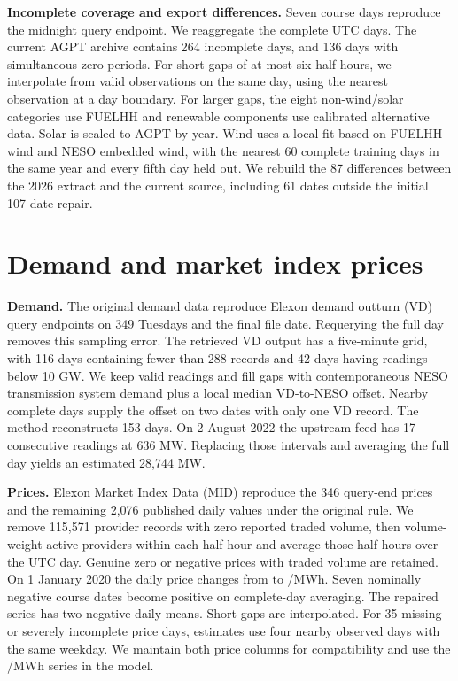 \textbf{Incomplete coverage and export differences.}
Seven course days reproduce the midnight query endpoint. We reaggregate
the complete UTC days. The current AGPT archive contains 264 incomplete
days, and
136 days with simultaneous zero periods. For short gaps of at most six
half-hours, we interpolate from valid observations on the same day, using
the nearest observation at a day boundary. For larger gaps, the eight
non-wind/solar categories use FUELHH and renewable components use
calibrated alternative data. Solar is scaled to AGPT by year. Wind
uses a local fit based on FUELHH wind and NESO embedded wind, with the
nearest 60 complete training days in the same year and every fifth day
held out. We rebuild the 87 differences between the 2026 extract and
the current source, including 61 dates outside the initial 107-date repair.

\newpage
\section{Demand and market index prices}
\textbf{Demand.}
The original demand data reproduce Elexon demand outturn (VD) query
endpoints on 349 Tuesdays and the final file date. Requerying the full
day removes this sampling error. The retrieved VD output has a
five-minute grid, with 116 days containing fewer than 288 records and
42 days having readings below 10 GW. We keep valid readings and fill
gaps with contemporaneous NESO transmission system demand plus a local
median VD-to-NESO offset. Nearby complete days supply the offset on two
dates with only one VD record. The method reconstructs 153 days. On
2 August 2022 the upstream feed has 17 consecutive readings at 636 MW.
Replacing those intervals and averaging the full day yields an estimated
28,744 MW.

\textbf{Prices.}
Elexon Market Index Data (MID) reproduce the 346 query-end prices and
the remaining 2,076 published daily values under the original rule.
We remove 115,571 provider records with zero reported traded volume,
then volume-weight active providers within each half-hour and average
those half-hours over the UTC day. Genuine zero or negative prices
with traded volume are retained. On 1 January 2020 the daily price
changes from  to /MWh. Seven nominally negative
course dates become positive on complete-day averaging. The repaired
series has two negative daily means. Short gaps are interpolated.
For 35 missing or severely incomplete price days, estimates use four
nearby observed days with the same weekday. We maintain both price
columns for compatibility and use the \gbp/MWh series in the model.

